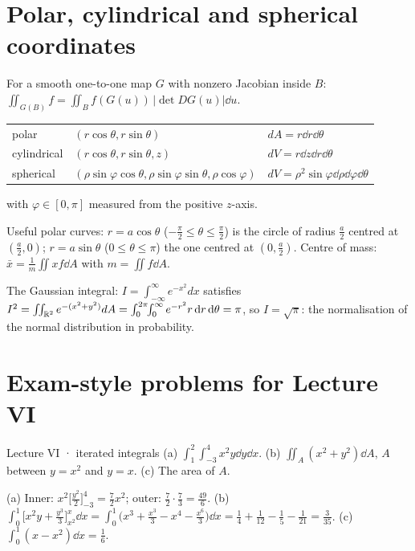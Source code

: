 \section{Polar, cylindrical and spherical coordinates}

\begin{thm}
For a smooth one-to-one map $G$ with nonzero Jacobian inside $B$:
$\iint_{G(B)}f=\iint_Bf(G(u))\,|\det DG(u)|\dd u$.
\begin{center}
\begin{tabular}{@{}lll@{}}
polar & $(r\cos\theta,r\sin\theta)$ & $dA=r\dd r\dd\theta$\\
cylindrical & $(r\cos\theta,r\sin\theta,z)$ & $dV=r\dd z\dd r\dd\theta$\\
spherical & $(\rho\sin\varphi\cos\theta,\rho\sin\varphi\sin\theta,\rho\cos\varphi)$ & $dV=\rho^2\sin\varphi\dd\rho\dd\varphi\dd\theta$
\end{tabular}
\end{center}
with $\varphi\in[0,\pi]$ measured from the positive $z$-axis.
\end{thm}

\begin{remember}
Useful polar curves: $r=a\cos\theta$ ($-\frac\pi2\le\theta\le\frac\pi2$) is the circle of radius $\frac a2$
centred at $(\frac a2,0)$; $r=a\sin\theta$ ($0\le\theta\le\pi$) the one centred at $(0,\frac a2)$. Centre of
mass: $\bar x=\frac1m\iint xf\dd A$ with $m=\iint f\dd A$.
\end{remember}

\begin{reallife}
The Gaussian integral: $I=\int_{-\infty}^{\infty}e^{-x^2}dx$ satisfies
$I^2=\iint_{\mathbb{R}^2}e^{-(x^2+y^2)}dA=\int_0^{2\pi}\!\!\int_0^\infty e^{-r^2}r\,\mathrm{d} r\,\mathrm{d}\theta=\pi$, so $I=\sqrt\pi$: the
normalisation of the normal distribution in probability.
\end{reallife}

\section{Exam-style problems for Lecture VI}

\begin{problem}{Lecture VI · iterated integrals}
(a) $\int_1^2\!\int_{-3}^4x^2y\dd y\dd x$. (b) $\iint_A(x^2+y^2)\dd A$, $A$ between $y=x^2$ and $y=x$.
(c) The area of $A$.
\end{problem}
\begin{solution}
(a) Inner: $x^2\big[\tfrac{y^2}2\big]_{-3}^4=\tfrac72x^2$; outer: $\tfrac72\cdot\tfrac73=\tfrac{49}6$.
(b) $\int_0^1\big[x^2y+\tfrac{y^3}3\big]_{x^2}^{x}\dd x=\int_0^1\big(x^3+\tfrac{x^3}3-x^4-\tfrac{x^6}3\big)\dd x
=\tfrac14+\tfrac1{12}-\tfrac15-\tfrac1{21}=\tfrac3{35}$.
(c) $\int_0^1(x-x^2)\dd x=\tfrac16$.
\end{solution}


